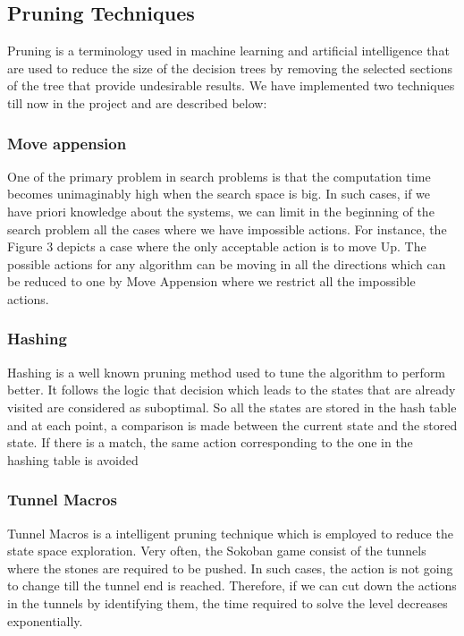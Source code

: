 \subsection{Pruning Techniques}
\noindent Pruning is a terminology used in machine learning and artificial intelligence that are used to reduce the size of the decision trees by removing the selected sections of the tree that provide undesirable results. We have implemented two techniques till now in the project and are described below:
\subsubsection{Move appension}
\noindent One of the primary problem in search problems is that the computation time becomes unimaginably high when the search space is big. In such cases, if we have priori knowledge about the systems, we can limit in the beginning of the search problem all the cases where we have impossible actions. For instance, the Figure 3 depicts a case where the only acceptable action is to move Up. The possible actions for any algorithm can be moving in all the directions which can be reduced to one by Move Appension where we restrict all the impossible actions.
\subsubsection{Hashing}
\noindent Hashing is a well known pruning method used to tune the algorithm to perform better. It follows the logic that decision which leads to the states that are already visited are considered as suboptimal. So all the states are stored in the hash table and at each point, a comparison is made between the current state and the stored state. If there is a match, the same action corresponding to the one in the hashing table is avoided
\subsubsection{Tunnel Macros}
\noindent Tunnel Macros is a intelligent pruning technique which is employed to reduce the state space exploration. Very often, the Sokoban game consist of the tunnels where the stones are required to be pushed. In such cases, the action is not going to change till the tunnel end is reached. Therefore, if we can cut down the actions in the tunnels by identifying them, the time required to solve the level decreases exponentially.
